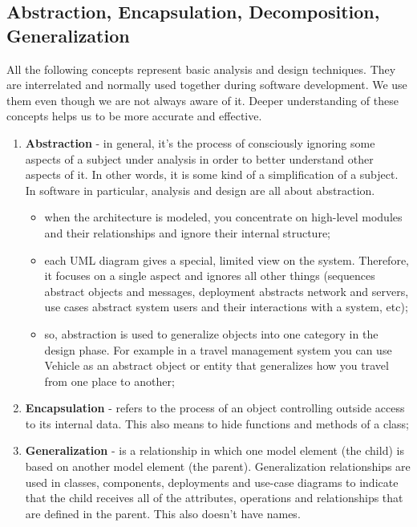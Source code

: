 \documentclass{article}
\begin{document}
		\subsection{Abstraction, Encapsulation, Decomposition, Generalization}
			All the following concepts represent basic analysis and design techniques. They are interrelated and normally used together during software development. We use them even though we are not always aware of it. Deeper understanding of these concepts helps us to be more accurate and effective.

			\begin{enumerate}
				\item \textbf{Abstraction} - in general, it's the process of consciously ignoring some aspects of a subject under analysis in order to better understand other aspects of it. In other words, it is some kind of a simplification of a subject. In software in particular, analysis and design are all about abstraction.
					\begin{itemize}
						\item when the architecture is modeled, you concentrate on high-level modules and their relationships and ignore their internal structure;

						\item each UML diagram gives a special, limited view on the system. Therefore, it focuses on a single aspect and ignores all other things (sequences abstract objects and messages, deployment abstracts network and servers, use cases abstract system users and their interactions with a system, etc);

						\item so, abstraction is used to generalize objects into one category in the design phase. For example in a travel management system you can use Vehicle as an abstract object or entity that generalizes how you travel from one place to another;
					\end{itemize}

				\item \textbf{Encapsulation} - refers to the process of an object controlling outside access to its internal data. This also means to hide functions and methods of a class;

				\item \textbf{Generalization} - is a relationship in which one model element (the child) is based on another model element (the parent). Generalization relationships are used in classes, components, deployments and use-case diagrams to indicate that the child receives all of the attributes, operations and relationships that are defined in the parent. This also doesn’t have names.


\end{enumerate}
\end{document}
